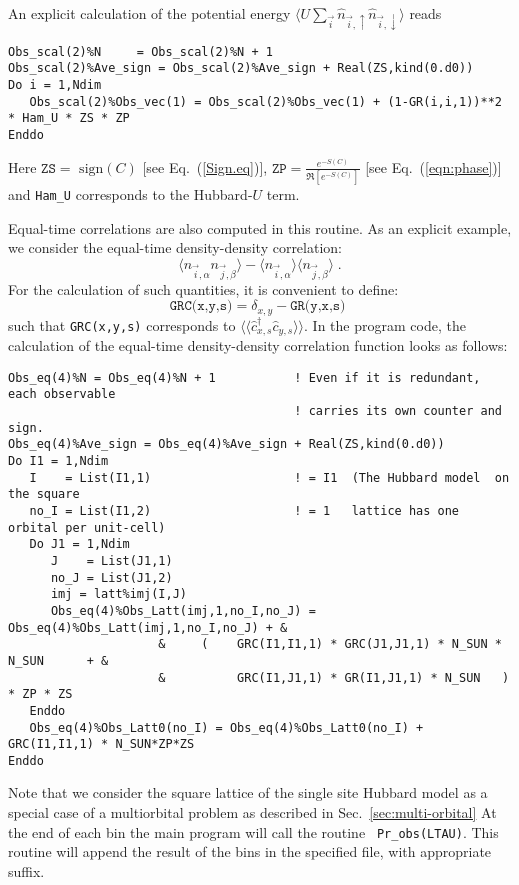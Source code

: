 An explicit calculation of the   potential energy  $ \langle U \sum_{\vec{i}}  \hat{n}_{\vec{i},\uparrow}   \hat{n}_{\vec{i},\downarrow}  \rangle $ reads 
\begin{lstlisting}[style=fortran]
Obs_scal(2)%N     = Obs_scal(2)%N + 1
Obs_scal(2)%Ave_sign = Obs_scal(2)%Ave_sign + Real(ZS,kind(0.d0))
Do i = 1,Ndim
   Obs_scal(2)%Obs_vec(1) = Obs_scal(2)%Obs_vec(1) + (1-GR(i,i,1))**2 * Ham_U * ZS * ZP
Enddo
\end{lstlisting} 
Here  $ \texttt{ZS} = \text{ sign} (C) $  [see Eq.~(\ref{Sign.eq})],  $ \texttt{ZP} =   \frac{e^{-S(C)}} {\Re \left[e^{-S(C)} \right]}   $ [see Eq.~(\ref{eqn:phase})] and  \texttt{Ham\_U}  corresponds to the Hubbard-$U$ term.

Equal-time correlations  are also computed in this routine. As an explicit example, we  consider the equal-time density-density correlation:
\begin{equation}
	 \langle n_{\vec{i},\alpha}   n_{\vec{j},\beta} \rangle   -  \langle n_{\vec{i},\alpha} \rangle  \langle    n_{\vec{j},\beta}  \rangle \;.
\end{equation} 
For the calculation of such quantities, it is convenient to  define: 
\begin{equation}
\label{GRC.eq}
	\texttt{GRC(x,y,s)}   =  \delta_{x,y}  - \texttt{GR(y,x,s)  }
\end{equation}
such that \texttt{GRC(x,y,s)}    corresponds to  $ \langle \langle  \hat{c}_{x,s}^{\dagger}\hat{c}_{y,s}^{\phantom\dagger} \rangle \rangle $. 
In the program code, the calculation of the equal-time density-density correlation function looks as follows:
\begin{lstlisting}[style=fortran]
Obs_eq(4)%N = Obs_eq(4)%N + 1           ! Even if it is redundant, each observable  
                                        ! carries its own counter and sign.
Obs_eq(4)%Ave_sign = Obs_eq(4)%Ave_sign + Real(ZS,kind(0.d0))  
Do I1 = 1,Ndim
   I    = List(I1,1)                    ! = I1  (The Hubbard model  on the square
   no_I = List(I1,2)                    ! = 1   lattice has one orbital per unit-cell)
   Do J1 = 1,Ndim                       
      J    = List(J1,1)
      no_J = List(J1,2)
      imj = latt%imj(I,J)
      Obs_eq(4)%Obs_Latt(imj,1,no_I,no_J) =  Obs_eq(4)%Obs_Latt(imj,1,no_I,no_J) + &
                     &     (    GRC(I1,I1,1) * GRC(J1,J1,1) * N_SUN * N_SUN      + &
                     &          GRC(I1,J1,1) * GR(I1,J1,1) * N_SUN   ) * ZP * ZS 
   Enddo
   Obs_eq(4)%Obs_Latt0(no_I) = Obs_eq(4)%Obs_Latt0(no_I) + GRC(I1,I1,1) * N_SUN*ZP*ZS
Enddo
\end{lstlisting} 
Note that we consider the  square lattice of the single site Hubbard model as a special case of a multiorbital problem as described in Sec.~\ref{sec:multi-orbital}
At the end of each bin  the main program will call the routine \texttt{ Pr\_obs(LTAU)}. This routine will append the result of the bins in the specified file,  with appropriate suffix. 

